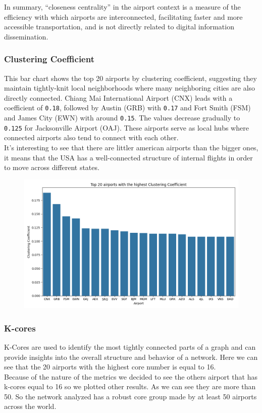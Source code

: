 \documentclass[12pt]{article}
\begin{document}
    In summary, “closeness centrality” in the airport context is a measure of the efficiency with which airports are interconnected, facilitating faster and more accessible transportation, and is not directly related to digital information dissemination.

    \subsubsection{Clustering Coefficient}
    This bar chart shows the top 20 airports by clustering coefficient, suggesting they maintain tightly-knit local neighborhoods where many neighboring cities are also directly connected. Chiang Mai International Airport (CNX) leads with a coefficient of \texttt{0.18}, followed by Austin (GRB) with \texttt{0.17} and Fort Smith (FSM) and James City (EWN) with around \texttt{0.15}. The values decrease gradually to \texttt{0.125} for Jacksonville Airport (OAJ). These airports serve as local hubs where connected airports also tend to connect with each other.\\
    It's interesting to see that there are littler american airports than the bigger ones, it means that the USA has a well-connected structure of internal flights in order to move across different states.

    \begin{figure}[H]
        \centering
        \includegraphics[width=0.8\linewidth]{img/clustering_coefficient}
    \end{figure}

    \subsubsection{K-cores}
    K-Cores are used to identify the most tightly connected parts of a graph and can provide insights into the overall structure and behavior of a network. Here we can see that the 20 airports with the highest core number is equal to 16.\\
    Because of the nature of the metrics we decided to see the others airport that has k-cores equal to 16 so we plotted other results. As we can see they are more than 50. So the network analyzed has a robust core group made by at least 50 airports across the world.
\end{document}
